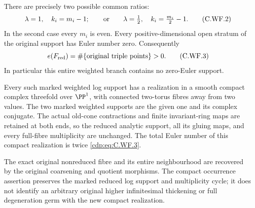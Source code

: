 \begin{proposition}
There are precisely two possible common ratios:
\[
 \lambda=1,\quad k_i=m_i-1;
 \qquad\hbox{or}\qquad
 \lambda=\tfrac12,\quad k_i=\tfrac{m_i}{2}-1.
\tag{C.WF.2}\label{cdp:eq:C.WF.2}
\]
In the second case every \(m_i\) is even.  Every positive-dimensional
open stratum of the original support has Euler number zero.
Consequently
\[
             e(F_{\mathrm{red}})
               =\#\{\hbox{original triple points}\}>0.
\tag{C.WF.3}\label{cdp:eq:C.WF.3}
\]
In particular this entire weighted branch contains no zero-Euler
support.

Every such marked weighted log support has a realization in a
smooth compact complex threefold over \(\PP^1\), with connected
two-torus fibres away from two values.  The two marked weighted
supports are the given one and its complex conjugate.  The actual
old-cone contractions and finite invariant-ring maps are retained
at both ends, so the reduced analytic support, all its gluing maps,
and every full-fibre multiplicity are unchanged.  The total Euler
number of this compact realization is twice \eqref{cdp:eq:C.WF.3}.

The exact original nonreduced fibre and its entire neighbourhood
are recovered by the original coarsening and quotient morphisms.
The compact occurrence assertion preserves the marked reduced
log support and multiplicity cycle; it does not identify an
arbitrary original higher infinitesimal thickening or full
degeneration germ with the new compact realization.
\end{proposition}

